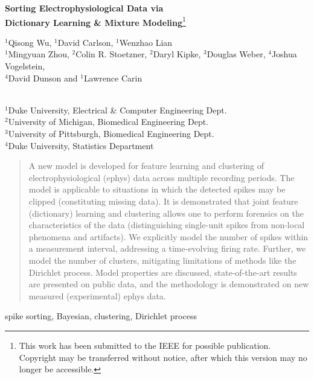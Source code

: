 \documentclass[journal]{IEEEtran}
\begin{document}
\singlespacing
\begin{center}
\textbf{\large Sorting Electrophysiological Data via\\ Dictionary Learning \& Mixture Modeling}\footnote{This work has been submitted to the IEEE for possible publication. Copyright may be transferred without notice, after which this version may no longer be accessible.} \\

\vspace{5mm}

\normalsize{$^1$Qisong Wu, $^1$David Carlson, $^1$Wenzhao Lian\\ $^1$Mingyuan Zhou, $^2$Colin R. Stoetzner, $^2$Daryl Kipke, $^3$Douglas Weber, $^4$Joshua Vogelstein, \\$^4$David Dunson and $^1$Lawrence Carin}\\~\\
\normalsize{$^1$Duke University, Electrical \& Computer Engineering Dept.\\
$^2$University of Michigan, Biomedical Engineering Dept. \\
$^3$University of Pittsburgh, Biomedical Engineering Dept.\\$^4$Duke University, Statistics Department


}
\end{center}


\begin{abstract}
A new model is developed for feature learning and clustering of electrophysiological (ephys) data across multiple recording periods. The model is applicable to situations in which the detected spikes may be clipped (constituting missing data). It is demonstrated that joint feature (dictionary) learning and clustering allows one to perform forensics on the characteristics of the data (distinguishing single-unit spikes from non-local phenomena and artifacts). We explicitly model the number of spikes within a measurement interval, addressing a time-evolving firing rate. Further, we model the number of clusters, mitigating limitations of methods like the Dirichlet process. Model properties are discussed, state-of-the-art results are presented on public data, and the methodology is demonstrated on new measured (experimental) ephys data.
\end{abstract}

\begin{keywords}
spike sorting, Bayesian, clustering, Dirichlet process
\end{keywords}
\end{document}
